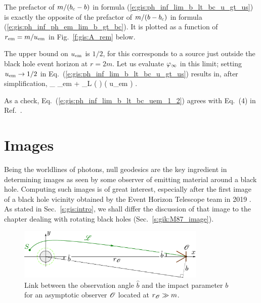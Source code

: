 \begin{remark} \label{r:gis:prefactor_b_bc}
The prefactor of $m/(b_{\rm c} - b)$ in
formula (\ref{e:gis:ph_inf_lim_b_lt_bc_u_gt_us}) is exactly the
opposite of the prefactor of $m/(b - b_{\rm c})$ in formula (\ref{e:gis:ph_inf_ph_em_lim_b_gt_bc}).
It is plotted as a function of $r_{\rm em} = m/u_{\rm em}$ in Fig.~\ref{f:gis:A_rem} below.
\end{remark}

The upper bound on $u_{\rm em}$ is $1/2$, for this corresponds to a source
just outside the black hole event horizon at $r=2m$. Let us evaluate
$\varphi_\infty$ in this limit; setting $u_{\rm em}\to 1/2$ in Eq.~(\ref{e:gis:ph_inf_lim_b_lt_bc_u_gt_us}) results in, after simplification,
\be  \label{e:gis:ph_inf_lim_b_lt_bc_uem_1_2}
   \ph_\infty  {} \ph_{\rm em}
    + \eps_L  \ln\left(  \right)
    \qquad \left( u_{\rm em} \to {} \right) .
\ee

\begin{remark}
As a check, Eq.~(\ref{e:gis:ph_inf_lim_b_lt_bc_uem_1_2}) agrees with
Eq.~(4) in Ref.~\cite{GrallHW19}.
\end{remark}



\section{Images} \label{s:gis:images}

Being the worldlines of photons, null geodesics are the key ingredient
in determining images as seen by some observer of emitting material around
a black hole. Computing such images is of great interest, especially after
the first image of a black hole vicinity obtained by
the Event Horizon Telescope team in 2019 \cite{EHT19a,Cardo19}.
As stated in Sec.~\ref{s:gis:intro}, we shall differ the discussion of
that image to the chapter dealing with rotating black holes
(Sec.~\ref{s:gik:M87_image}).

\begin{figure}
\centerline{\includegraphics[width=0.8\textwidth]{gis_obs_angle.pdf}}
\caption[]{\label{f:gis:obs_angle} \footnotesize
Link between the observation angle $\hat{b}$ and the impact parameter $b$
for an asymptotic observer $\mathscr{O}$ located at $r_{\mathscr{O}} \gg m$.}
\end{figure}


